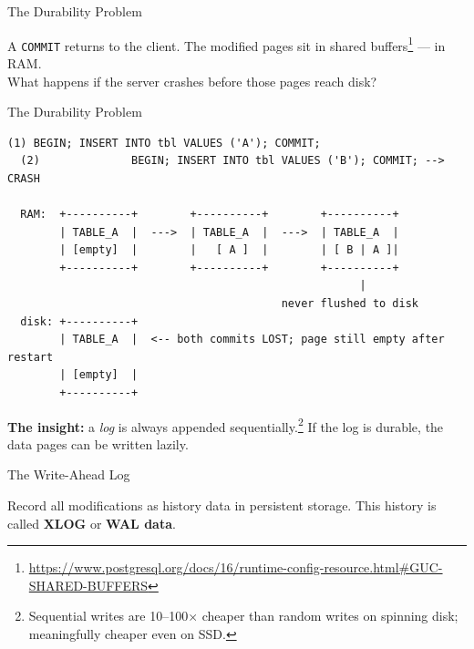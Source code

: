 \documentclass[aspectratio=169,10pt]{beamer}
\begin{document}
\begin{frame}{The Durability Problem}

  \begin{block}{}
    A \texttt{COMMIT} returns to the client.  The modified pages sit
    in shared buffers\footnote{\url{https://www.postgresql.org/docs/16/runtime-config-resource.html\#GUC-SHARED-BUFFERS}} --- in RAM.\\[0.4em]
    What happens if the server crashes before those pages reach disk?
  \end{block}

\end{frame}

\begin{frame}[fragile]{The Durability Problem}

  \begin{lstlisting}[style=ascii]
  (1) BEGIN; INSERT INTO tbl VALUES ('A'); COMMIT;
  (2)              BEGIN; INSERT INTO tbl VALUES ('B'); COMMIT; --> CRASH

  RAM:  +----------+        +----------+        +----------+
        | TABLE_A  |  --->  | TABLE_A  |  --->  | TABLE_A  |
        | [empty]  |        |   [ A ]  |        | [ B | A ]|
        +----------+        +----------+        +----------+
                                                      |
                                          never flushed to disk
  disk: +----------+
        | TABLE_A  |  <-- both commits LOST; page still empty after restart
        | [empty]  |
        +----------+
  \end{lstlisting}

  \vspace{0.4em}
  \textbf{The insight:} a \textit{log} is always appended sequentially.\footnote{Sequential writes are 10--100$\times$ cheaper than random writes on spinning disk; meaningfully cheaper even on SSD.}
  If the log is durable, the data pages can be written lazily.
\end{frame}

\begin{frame}{The Write-Ahead Log}

  \begin{block}{}
    Record all modifications as history data in persistent storage.
    This history is called \textbf{XLOG} or \textbf{WAL data}.
  \end{block}

\end{frame}
\end{document}
